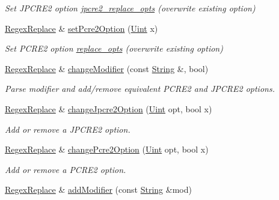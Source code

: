 \begin{DoxyCompactItemize}
\begin{DoxyCompactList}\small\item\em Set J\+P\+C\+R\+E2 option \hyperlink{classjpcre2_1_1RegexReplace_acf13bcb16918df4b7bcaa7e49a1c7d59}{jpcre2\+\_\+replace\+\_\+opts} (overwrite existing option) \end{DoxyCompactList}\item 
\hyperlink{classjpcre2_1_1RegexReplace}{Regex\+Replace} \& \hyperlink{classjpcre2_1_1RegexReplace_aec36272d351fdc3a8cb02a4a3efea5a2}{set\+Pcre2\+Option} (\hyperlink{namespacejpcre2_a078242d38221a13fb3543b9edd78c099}{Uint} x)
\begin{DoxyCompactList}\small\item\em Set P\+C\+R\+E2 option \hyperlink{classjpcre2_1_1RegexReplace_afc79699cfcad8b7cbb26864b6b67cdc7}{replace\+\_\+opts} (overwrite existing option) \end{DoxyCompactList}\item 
\hyperlink{classjpcre2_1_1RegexReplace}{Regex\+Replace} \& \hyperlink{classjpcre2_1_1RegexReplace_a0a2dc39fc28e6f7fe0a5d638f5891bdb}{change\+Modifier} (const \hyperlink{namespacejpcre2_a91f03070152fb228bc116c5a737f1d16}{String} \&, bool)
\begin{DoxyCompactList}\small\item\em Parse modifier and add/remove equivalent P\+C\+R\+E2 and J\+P\+C\+R\+E2 options. \end{DoxyCompactList}\item 
\hyperlink{classjpcre2_1_1RegexReplace}{Regex\+Replace} \& \hyperlink{classjpcre2_1_1RegexReplace_afebf5e76bce8e312ab6dbdec3288b02b}{change\+Jpcre2\+Option} (\hyperlink{namespacejpcre2_a078242d38221a13fb3543b9edd78c099}{Uint} opt, bool x)
\begin{DoxyCompactList}\small\item\em Add or remove a J\+P\+C\+R\+E2 option. \end{DoxyCompactList}\item 
\hyperlink{classjpcre2_1_1RegexReplace}{Regex\+Replace} \& \hyperlink{classjpcre2_1_1RegexReplace_aea15c694bba7d994f048596a1f90f71f}{change\+Pcre2\+Option} (\hyperlink{namespacejpcre2_a078242d38221a13fb3543b9edd78c099}{Uint} opt, bool x)
\begin{DoxyCompactList}\small\item\em Add or remove a P\+C\+R\+E2 option. \end{DoxyCompactList}\item 
\hyperlink{classjpcre2_1_1RegexReplace}{Regex\+Replace} \& \hyperlink{classjpcre2_1_1RegexReplace_a06a57430f62058822d48722a2a6425d7}{add\+Modifier} (const \hyperlink{namespacejpcre2_a91f03070152fb228bc116c5a737f1d16}{String} \&mod)

\end{DoxyCompactItemize}
